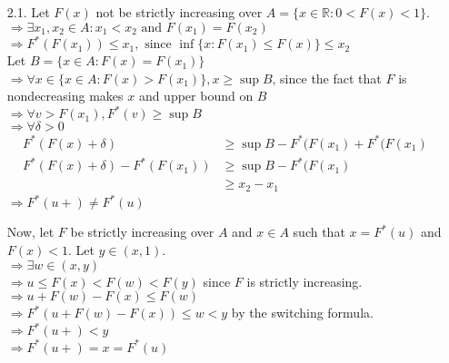 \documentclass[11pt]{article}
\newcommand{\R}{\mathbb{R}}
\theoremstyle{definition}
\begin{document}
\begin{itemize}
    \item[2.1.]
        Let $F(x)$ not be strictly increasing over \(A=\{x\in\R: 0<F(x)<1\}\). \\
        \(\Rightarrow \exists x_1,x_2\in A: x_1<x_2 \mbox{ and } F(x_1)=F(x_2)\) \\
        \(\Rightarrow F^*(F(x_1))\leq x_1, \mbox{ since } \inf\{x:F(x_1)\leq F(x)\} \leq x_2 \) \\
        Let \(B = \{x\in A: F(x)=F(x_1)\} \) \\
        \(\Rightarrow \forall x\in \{ x\in A: F(x)>F(x_1)\}, x\geq \sup B \), since the fact that $F$ is nondecreasing makes $x$ and upper bound on $B$ \\
        \(\Rightarrow \forall v> F(x_1), F^*(v)\geq \sup B \) \\
        \(\Rightarrow \forall \delta > 0 \)
        \begin{align*}
            F^*(F(x)+\delta)             &\geq \sup B -F^*(F(x_1)+F^*(F(x_1) \\
            F^*(F(x)+\delta) -F^*(F(x_1)) &\geq \sup B -F^*(F(x_1) \\
                                         &\geq x_2 - x_1
        \end{align*}
        \(\Rightarrow F^*(u+)\neq F^*(u)\)
        \smallskip

        Now, let $F$ be strictly increasing over $A$ and $x\in A$ such that \(x=F^*(u)\) and \(F(x)<1\). Let \(y\in(x,1)\). \\
        \( \Rightarrow \exists w\in(x,y) \) \\
        \( \Rightarrow u\leq F(x) < F(w) < F(y) \) since $F$ is strictly increasing.\\
        \( \Rightarrow u+F(w)-F(x) \leq F(w) \) \\
        \( \Rightarrow F^*(u+F(w)-F(x)) \leq w < y \) by the switching formula. \\
        \( \Rightarrow F^*(u+) < y \) \\
        \( \Rightarrow F^*(u+) = x = F^*(u) \)
        \smallskip


\end{itemize}
\end{document}
